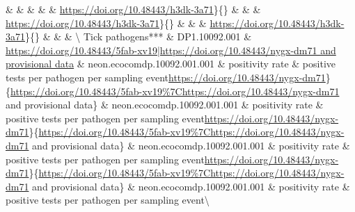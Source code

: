 \documentclass[
  12pt,
]{article}
\begin{document}
 \&  \& \href{https://doi.org/10.48443/j1g9-2j27|https://doi.org/10.48443/h3dk-3a71}{} \&  \&  \& \textbar{}\url{https://doi.org/10.48443/h3dk-3a71}\}\{\} \&  \&  \& \textbar{}\url{https://doi.org/10.48443/h3dk-3a71}\}\{\} \&  \&  \& \textbar{}\url{https://doi.org/10.48443/h3dk-3a71}\}\{\} \&  \&  \& \textbackslash{}
Tick pathogens*** \& DP1.10092.001 \& \href{https://doi.org/10.48443/5fab-xv19|https://doi.org/10.48443/nygx-dm71}{https://doi.org/10.48443/5fab-xv19|https://doi.org/10.48443/nygx-dm71 and provisional data} \& neon.ecocomdp.10092.001.001 \& positivity rate \& positive tests per pathogen per sampling event\textbar{}\url{https://doi.org/10.48443/nygx-dm71}\}\{\url{https://doi.org/10.48443/5fab-xv19\%7Chttps://doi.org/10.48443/nygx-dm71} and provisional data\} \& neon.ecocomdp.10092.001.001 \& positivity rate \& positive tests per pathogen per sampling event\textbar{}\url{https://doi.org/10.48443/nygx-dm71}\}\{\url{https://doi.org/10.48443/5fab-xv19\%7Chttps://doi.org/10.48443/nygx-dm71} and provisional data\} \& neon.ecocomdp.10092.001.001 \& positivity rate \& positive tests per pathogen per sampling event\textbar{}\url{https://doi.org/10.48443/nygx-dm71}\}\{\url{https://doi.org/10.48443/5fab-xv19\%7Chttps://doi.org/10.48443/nygx-dm71} and provisional data\} \& neon.ecocomdp.10092.001.001 \& positivity rate \& positive tests per pathogen per sampling event\textbackslash{}
\end{document}
